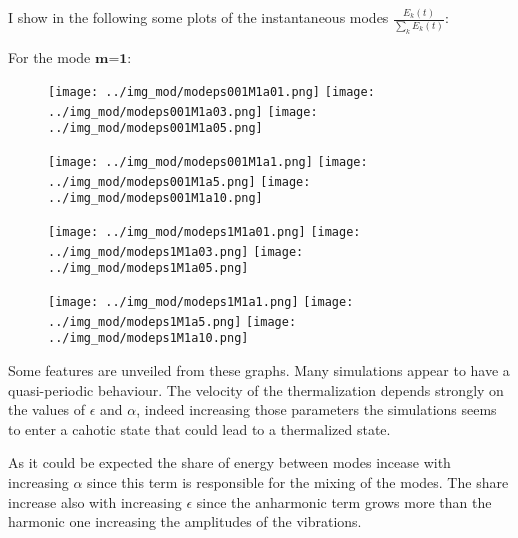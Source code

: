 \documentclass[10pt]{article}
\numberwithin{equation}{section}
\begin{document}
I show in the following some plots of the instantaneous modes  $\frac{E_k(t)}{\sum_k E_k (t)}$:

For the mode $\textbf{m=1}$:
\begin{figure}[!htb]
    \texttt{[image: ../img\_mod/modeps001M1a01.png]}
\endminipage \hfill
{}
    \texttt{[image: ../img\_mod/modeps001M1a03.png]}
\endminipage \hfill
{}
    \texttt{[image: ../img\_mod/modeps001M1a05.png]}
\endminipage 
\end{figure}

\begin{figure}[!htb]
    \texttt{[image: ../img\_mod/modeps001M1a1.png]}
\endminipage \hfill
{}
    \texttt{[image: ../img\_mod/modeps001M1a5.png]}
\endminipage \hfill
{}
    \texttt{[image: ../img\_mod/modeps001M1a10.png]}
\endminipage 
\end{figure}

\begin{figure}[!htb]
    \texttt{[image: ../img\_mod/modeps1M1a01.png]}
\endminipage \hfill
{}
    \texttt{[image: ../img\_mod/modeps1M1a03.png]}
\endminipage \hfill
{}
    \texttt{[image: ../img\_mod/modeps1M1a05.png]}
\endminipage 
\end{figure}

\clearpage

\begin{figure}[!htb]
    \texttt{[image: ../img\_mod/modeps1M1a1.png]}
\endminipage \hfill
{}
    \texttt{[image: ../img\_mod/modeps1M1a5.png]}
\endminipage \hfill
{}
    \texttt{[image: ../img\_mod/modeps1M1a10.png]}
\endminipage 
\end{figure}

Some features are unveiled from these graphs. Many simulations appear to have a quasi-periodic behaviour. The velocity of the thermalization depends strongly on the values of $\epsilon$ and $\alpha$, indeed increasing those parameters the simulations seems to enter a cahotic state that could lead to a thermalized state. 

As it could be expected the share of energy between modes incease with increasing $\alpha$ since this term is responsible for the mixing of the modes. The share increase also with increasing $\epsilon$ since the anharmonic term grows more than the harmonic one increasing the amplitudes of the vibrations. 
\end{document}
